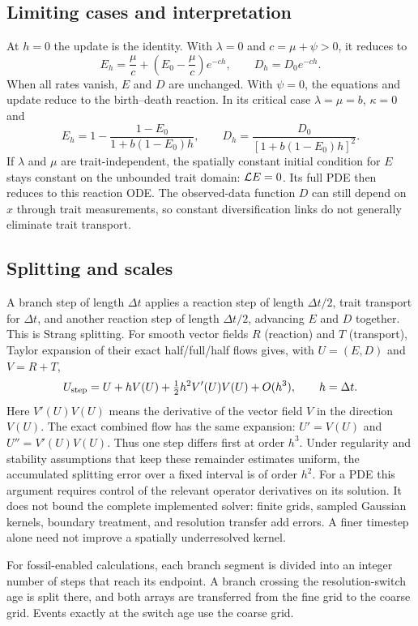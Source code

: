 \documentclass[11pt]{article}
\begin{document}
\subsection{Limiting cases and interpretation}
At $h=0$ the update is the identity. With $\lambda=0$ and $c=\mu+\psi>0$, it reduces to
\[
 E_h=\frac{\mu}{c}+\left(E_0-\frac{\mu}{c}\right)e^{-ch},
 \qquad D_h=D_0e^{-ch}.
\]
When all rates vanish, $E$ and $D$ are unchanged. With $\psi=0$, the equations and update reduce
to the birth--death reaction. In its critical case $\lambda=\mu=b$, $\kappa=0$ and
\[
 E_h=1-\frac{1-E_0}{1+b(1-E_0)h},
 \qquad D_h=\frac{D_0}{[1+b(1-E_0)h]^2}.
\]
If $\lambda$ and $\mu$ are trait-independent, the spatially constant initial condition for
$E$ stays constant on the unbounded trait domain: $\mathcal{L} E=0$. Its full PDE then reduces to
this reaction ODE. The observed-data function $D$ can still depend on $x$ through trait
measurements, so constant diversification links do not generally eliminate trait transport.

\subsection{Splitting and scales}
A branch step of length $\Delta t$ applies a reaction step of length $\Delta t/2$, trait
transport for $\Delta t$, and another reaction step of length $\Delta t/2$, advancing $E$ and
$D$ together. This is Strang splitting. For smooth vector fields $R$ (reaction) and $T$
(transport), Taylor expansion of their exact half/full/half flows gives, with $U=(E,D)$
and $V=R+T$,
\[
 U_{\rm step}=U+hV(U)+\tfrac12 h^2 V'(U)V(U)+O(h^3),\qquad h=\Delta t.
\]
Here $V'(U)V(U)$ means the derivative of the vector field $V$ in the direction $V(U)$.
The exact combined flow has the same expansion: $U'=V(U)$ and $U''=V'(U)V(U)$.
Thus one step differs first at order $h^3$. Under regularity and stability
assumptions that keep these remainder estimates uniform, the accumulated splitting error over a
fixed interval is of order $h^2$. For a PDE this argument requires control of the relevant
operator derivatives on its solution. It does not bound the complete implemented solver:
finite grids, sampled Gaussian kernels, boundary treatment, and resolution transfer add errors.
A finer timestep alone need not improve a spatially underresolved kernel.

For fossil-enabled calculations, each branch segment is divided into an integer number of
steps that reach its endpoint. A branch crossing the resolution-switch age is split there,
and both arrays are transferred from the fine grid to the coarse grid. Events exactly at
the switch age use the coarse grid.
\end{document}
